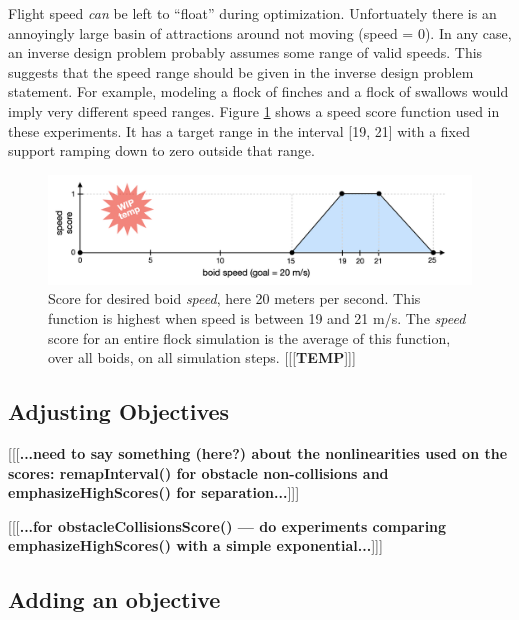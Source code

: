 \documentclass[letterpaper]{article}
\begin{document}
Flight speed \textit{can} be left to “float” during optimization. Unfortuately there is an annoyingly large basin of attractions around not moving (speed = 0). In any case, an inverse design problem probably assumes some range of valid speeds. This suggests that the speed range should be given in the inverse design problem statement. For example, modeling a flock of finches and a flock of swallows would imply very different speed ranges. Figure \ref{fig:speed_score} shows a speed score function used in these experiments. It has a target range in the interval [19, 21] with a fixed support ramping down to zero outside that range.


\begin{figure}[t]
    \centering
    \includegraphics[width=0.9\linewidth]{images/temp_speed_score.png}
    \caption{Score for desired boid \textit{speed}, here 20 meters per second. This function is highest when speed is between 19 and 21 m/s. The \textit{speed} score for an entire flock simulation is the average of this function, over all boids, on all simulation steps. [[[\textbf{TEMP}]]]}
    \label{fig:speed_score}
\end{figure}



\subsection{Adjusting Objectives}
\label{subsec:adjust_objective}

[[[\textbf{...need to say something (here?) about the nonlinearities used on the scores: remapInterval() for obstacle non-collisions and emphasizeHighScores() for separation...}]]]

[[[\textbf{...for obstacleCollisionsScore() --- do experiments comparing emphasizeHighScores() with a simple exponential...}]]]

\subsection{Adding an objective}
\label{subsec:add_objective}
\end{document}
